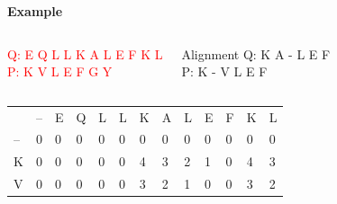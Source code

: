 \documentclass{bredelebeamer}
\begin{document}
\begin{frame}
\centering
  \begin{Large}
   \textbf{Example} \linebreak
  \end{Large}
\begin{columns}
\textcolor{red}{Q:  E Q L L K A L E F K L \\
P:  K V L E F G Y}

\begin{block}{Alignment}
Q:  K A - L E F \\
P:  K - V L E F
\end{block}
\end{columns}
\begin{table}[]
\centering
\begin{tabular}{lllllllllllll}
                        & --                     & E                      & Q                      & L                      & L                                              & K                                              & A                                              & L                                              & E                                               & F                                               & K                       & L                       \\ \cline{2-13} 
\multicolumn{1}{l|}{--} & \multicolumn{1}{l|}{0} & \multicolumn{1}{l|}{0} & \multicolumn{1}{l|}{0} & \multicolumn{1}{l|}{0} & \multicolumn{1}{l|}{\cellcolor[HTML]{3166FF}0} & \multicolumn{1}{l|}{0}                         & \multicolumn{1}{l|}{0}                         & \multicolumn{1}{l|}{0}                         & \multicolumn{1}{l|}{0}                          & \multicolumn{1}{l|}{0}                          & \multicolumn{1}{l|}{0}  & \multicolumn{1}{l|}{0}  \\ \cline{2-13} 
\multicolumn{1}{l|}{K}  & \multicolumn{1}{l|}{0} & \multicolumn{1}{l|}{0} & \multicolumn{1}{l|}{0} & \multicolumn{1}{l|}{0} & \multicolumn{1}{l|}{0}                         & \multicolumn{1}{l|}{\cellcolor[HTML]{3166FF}4} & \multicolumn{1}{l|}{\cellcolor[HTML]{3166FF}3} & \multicolumn{1}{l|}{2}                         & \multicolumn{1}{l|}{1}                          & \multicolumn{1}{l|}{0}                          & \multicolumn{1}{l|}{4}  & \multicolumn{1}{l|}{3}  \\ \cline{2-13} 
\multicolumn{1}{l|}{V}  & \multicolumn{1}{l|}{0} & \multicolumn{1}{l|}{0} & \multicolumn{1}{l|}{0} & \multicolumn{1}{l|}{0} & \multicolumn{1}{l|}{0}                         & \multicolumn{1}{l|}{3}                         & \multicolumn{1}{l|}{\cellcolor[HTML]{3166FF}2} & \multicolumn{1}{l|}{1}                         & \multicolumn{1}{l|}{0}                          & \multicolumn{1}{l|}{0}                          & \multicolumn{1}{l|}{3}  & \multicolumn{1}{l|}{2}  \\ \cline{2-13} 

\end{tabular}
\end{table}
\end{frame}
\end{document}
